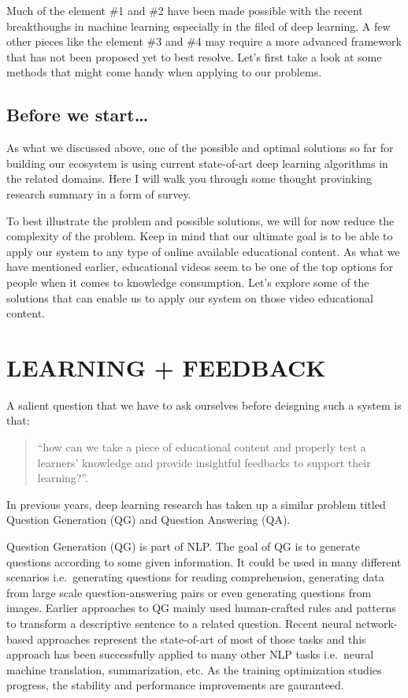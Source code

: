 \documentclass[]{book}
\theoremstyle{definition}
\theoremstyle{definition}
\theoremstyle{definition}
\theoremstyle{remark}
\begin{document}
Much of the element \#1 and \#2 have been made possible with the recent
breakthoughs in machine learning especially in the filed of deep
learning. A few other pieces like the element \#3 and \#4 may require a
more advanced framework that has not been proposed yet to best resolve.
Let's first take a look at some methods that might come handy when
applying to our problems.

\section{Before we start\ldots{}}\label{before-we-start}

As what we discussed above, one of the possible and optimal solutions so
far for building our ecosystem is using current state-of-art deep
learning algorithms in the related domains. Here I will walk you through
some thought provinking research summary in a form of survey.

To best illustrate the problem and possible solutions, we will for now
reduce the complexity of the problem. Keep in mind that our ultimate
goal is to be able to apply our system to any type of online available
educational content. As what we have mentioned earlier, educational
videos seem to be one of the top options for people when it comes to
knowledge consumption. Let's explore some of the solutions that can
enable us to apply our system on those video educational content.

\chapter{LEARNING + FEEDBACK}\label{learning-feedback}

A salient question that we have to ask ourselves before deisgning such a
system is that:

\begin{quote}
``how can we take a piece of educational content and properly test a
learners' knowledge and provide insightful feedbacks to support their
learning?''.
\end{quote}

In previous years, deep learning research has taken up a similar problem
titled Question Generation (QG) and Question Answering (QA).

Question Generation (QG) is part of NLP. The goal of QG is to generate
questions according to some given information. It could be used in many
different scenarios i.e.~generating questions for reading comprehension,
generating data from large scale question-answering pairs or even
generating questions from images. Earlier approaches to QG mainly used
human-crafted rules and patterns to transform a descriptive sentence to
a related question. Recent neural network-based approaches represent the
state-of-art of most of those tasks and this approach has been
successfully applied to many other NLP tasks i.e.~neural machine
translation, summarization, etc. As the training optimization studies
progress, the stability and performance improvements are gauranteed.
\end{document}
